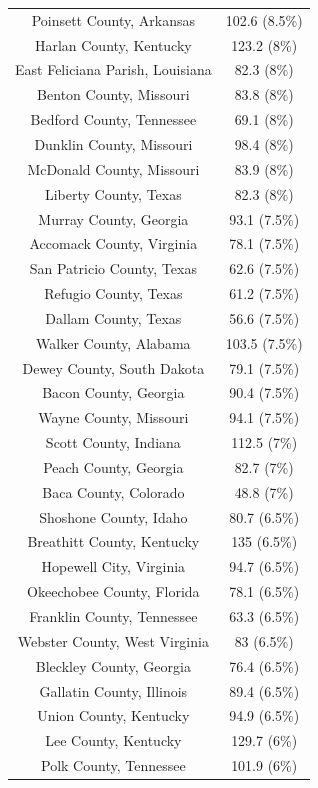 \begin{table}[ht]
\begin{tabular}{cc}
  Poinsett County, Arkansas & 102.6 (8.5\%) \\ 
  Harlan County, Kentucky & 123.2 (8\%) \\ 
  East Feliciana Parish, Louisiana & 82.3 (8\%) \\ 
  Benton County, Missouri & 83.8 (8\%) \\ 
  Bedford County, Tennessee & 69.1 (8\%) \\ 
  Dunklin County, Missouri & 98.4 (8\%) \\ 
  McDonald County, Missouri & 83.9 (8\%) \\ 
  Liberty County, Texas & 82.3 (8\%) \\ 
  Murray County, Georgia & 93.1 (7.5\%) \\ 
  Accomack County, Virginia & 78.1 (7.5\%) \\ 
  San Patricio County, Texas & 62.6 (7.5\%) \\ 
  Refugio County, Texas & 61.2 (7.5\%) \\ 
  Dallam County, Texas & 56.6 (7.5\%) \\ 
  Walker County, Alabama & 103.5 (7.5\%) \\ 
  Dewey County, South Dakota & 79.1 (7.5\%) \\ 
  Bacon County, Georgia & 90.4 (7.5\%) \\ 
  Wayne County, Missouri & 94.1 (7.5\%) \\ 
  Scott County, Indiana & 112.5 (7\%) \\ 
  Peach County, Georgia & 82.7 (7\%) \\ 
  Baca County, Colorado & 48.8 (7\%) \\ 
  Shoshone County, Idaho & 80.7 (6.5\%) \\ 
  Breathitt County, Kentucky & 135 (6.5\%) \\ 
  Hopewell City, Virginia & 94.7 (6.5\%) \\ 
  Okeechobee County, Florida & 78.1 (6.5\%) \\ 
  Franklin County, Tennessee & 63.3 (6.5\%) \\ 
  Webster County, West Virginia & 83 (6.5\%) \\ 
  Bleckley County, Georgia & 76.4 (6.5\%) \\ 
  Gallatin County, Illinois & 89.4 (6.5\%) \\ 
  Union County, Kentucky & 94.9 (6.5\%) \\ 
  Lee County, Kentucky & 129.7 (6\%) \\ 
  Polk County, Tennessee & 101.9 (6\%) \\ 

\end{tabular}
\end{table}
